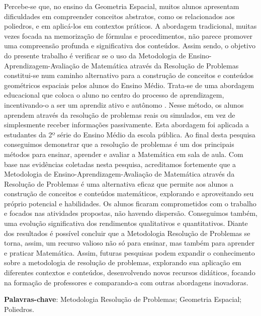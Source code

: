 \begin{resumo}
  Percebe-se que, no ensino da Geometria Espacial, muitos alunos apresentam dificuldades em compreender conceitos abstratos, como os relacionados aos poliedros, e em aplicá-los em contextos práticos. A abordagem tradicional, muitas vezes focada na memorização de fórmulas e procedimentos, não parece promover uma compreensão profunda e significativa dos conteúdos. Assim sendo, o objetivo do presente trabalho é verificar se o uso da Metodologia de Ensino-Aprendizagem-Avaliação de Matemática através da Resolução de Problemas \cite{resolucaoDeProblemas2019, polya1978} constitui-se num caminho alternativo para a construção de conceitos e conteúdos geométricos espaciais pelos alunos do Ensino Médio. Trata-se de uma abordagem educacional que coloca o aluno no centro do processo de aprendizagem, incentivando-o a ser um aprendiz ativo e autônomo \cite{polya1978}. Nesse método, os alunos aprendem através da resolução de problemas reais ou simulados, em vez de simplesmente receber informações passivamente. Esta abordagem foi aplicada a estudantes da 2º série do Ensino Médio da escola pública. Ao final desta pesquisa conseguimos demonstrar que a resolução de problemas é um dos principais métodos para ensinar, aprender e avaliar a Matemática em sala de aula. Com base nas evidências coletadas nesta pesquisa, acreditamos fortemente que a Metodologia de Ensino-Aprendizagem-Avaliação de Matemática através da Resolução de Problemas é uma alternativa eficaz que permite aos alunos a construção de conceitos e conteúdos matemáticos, explorando e aproveitando seu próprio potencial e habilidades. Os alunos ficaram comprometidos com o trabalho e focados nas atividades propostas, não havendo dispersão. Conseguimos também, uma evolução significativa dos rendimentos qualitativos e quantitativos. Diante dos resultados é possível concluir que a Metodologia Resolução de Problemas se torna, assim, um recurso valioso não só para ensinar, mas também para aprender e praticar Matemática. Assim, futuras pesquisas podem expandir o conhecimento sobre a metodologia de resolução de problemas, explorando sua aplicação em diferentes contextos e conteúdos, desenvolvendo novos recursos didáticos, focando na formação de professores e comparando-a com outras abordagens inovadoras.

  \textbf{Palavras-chave}:  Metodologia Resolução de Problemas; Geometria Espacial; Poliedros.

\end{resumo}
